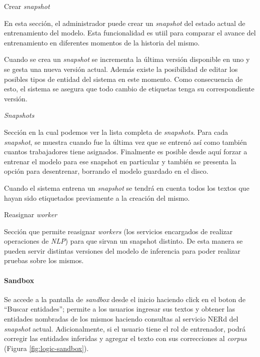 \documentclass[12pt,a4paper,]{scrartcl}
\let\oldparagraph\paragraph
\renewcommand{\paragraph}[1]{\oldparagraph{#1}\mbox{}}
\begin{document}
Crear \emph{snapshot}

En esta sección, el administrador puede crear un \emph{snapshot} del estado actual de entrenamiento del modelo. Esta funcionalidad es utiil para comparar el avance del entrenamiento en diferentes momentos de la historia del mismo.

Cuando se crea un \emph{snapshot} se incrementa la última versión disponible en uno y se gesta una nueva versión actual. Además existe la posibilidad de editar los posibles tipos de entidad del sistema en este momento. Como consecuencia de esto, el sistema se asegura que todo cambio de etiquetas tenga su correspondiente versión.

\emph{Snapshots}

Sección en la cual podemos ver la lista completa de \emph{snapshots}.
Para cada \emph{snapshot}, se muestra cuando fue la última vez que se entrenó así como también cuantos trabajadores tiene asignados. Finalmente es posible desde aquí forzar a entrenar el modelo para ese snapshot en particular y también se presenta la opción para desentrenar, borrando el modelo guardado en el disco.

Cuando el sistema entrena un \emph{snapshot} se tendrá en cuenta todos los textos que hayan sido etiquetados previamente a la creación del mismo.

Reasignar \emph{worker}

Sección que permite reasignar \emph{workers} (los servicios encargados de realizar operaciones de \emph{NLP}) para que sirvan un snapshot distinto. De esta manera se pueden servir distintas versiones del modelo de inferencia para poder realizar pruebas sobre los mismos.

\hypertarget{sandbox}{%
\paragraph{Sandbox}\label{sandbox}}

Se accede a la pantalla de \emph{sandbox} desde el inicio haciendo click en el boton de \enquote{Buscar entidades}; permite a los usuarios ingresar sus textos y obtener las entidades nombradas de los mismos haciendo consultas al servicio NERd del \emph{snapshot} actual.
Adicionalmente, si el usuario tiene el rol de entrenador, podrá corregir las entidades inferidas y agregar el texto con sus correcciones al \emph{corpus} (Figura \ref{fig:logic-sandbox}).
\end{document}
